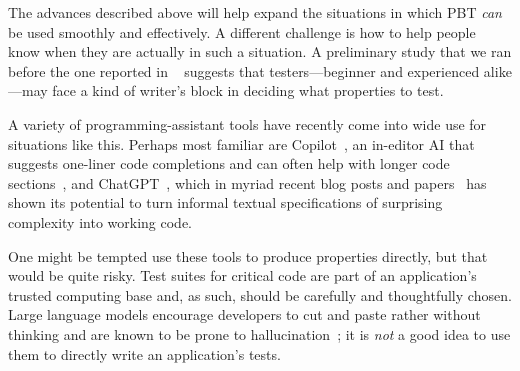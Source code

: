 

%
The advances described above will help expand the situations in which
PBT {\em can} be used smoothly and effectively.  A different challenge is
how to help people know when they are actually in such a situation.
A preliminary study that we ran before the one reported in ~\cite{goldstein_problems_2022} suggests that testers---beginner and experienced alike---may face a kind of writer's block
in deciding what properties to test.

A variety of
programming-assistant tools have recently come into wide use for situations
like this. Perhaps most familiar are
Copilot~\cite{tool:copilot}, an in-editor AI that suggests one-liner code
completions and can often help with longer code
sections~\cite{ref:dohmke2022github}, and ChatGPT~\cite{tool:chatgpt}, which in
myriad recent blog posts and papers~\cite{ref:bubeck2023sparks,ref:savelka2023thrilled} has shown its potential to turn
informal textual specifications of surprising complexity into working code.

One might be tempted use these tools to produce properties directly,
but that would be quite risky. Test suites for critical code are part
of an application's {trusted computing base} and, as such, should
be carefully and thoughtfully chosen. Large language models encourage developers to cut and
paste rather without thinking and are known to be prone
to hallucination~\cite{ji2023survey}; it is {\em not} a good idea
to use them to directly write an application's tests.


